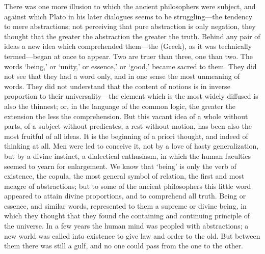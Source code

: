 \documentclass[11pt,letter]{article}
\begin{document}
\par  There was one more illusion to which the ancient philosophers were subject, and against which Plato in his later dialogues seems to be struggling—the tendency to mere abstractions; not perceiving that pure abstraction is only negation, they thought that the greater the abstraction the greater the truth. Behind any pair of ideas a new idea which comprehended them—the (Greek), as it was technically termed—began at once to appear. Two are truer than three, one than two. The words ‘being,’ or ‘unity,’ or essence,’ or ‘good,’ became sacred to them. They did not see that they had a word only, and in one sense the most unmeaning of words. They did not understand that the content of notions is in inverse proportion to their universality—the element which is the most widely diffused is also the thinnest; or, in the language of the common logic, the greater the extension the less the comprehension. But this vacant idea of a whole without parts, of a subject without predicates, a rest without motion, has been also the most fruitful of all ideas. It is the beginning of a priori thought, and indeed of thinking at all. Men were led to conceive it, not by a love of hasty generalization, but by a divine instinct, a dialectical enthusiasm, in which the human faculties seemed to yearn for enlargement. We know that ‘being’ is only the verb of existence, the copula, the most general symbol of relation, the first and most meagre of abstractions; but to some of the ancient philosophers this little word appeared to attain divine proportions, and to comprehend all truth. Being or essence, and similar words, represented to them a supreme or divine being, in which they thought that they found the containing and continuing principle of the universe. In a few years the human mind was peopled with abstractions; a new world was called into existence to give law and order to the old. But between them there was still a gulf, and no one could pass from the one to the other.
\end{document}
